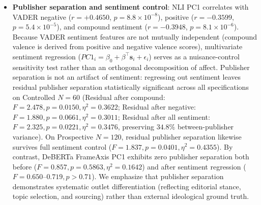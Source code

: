 \begin{itemize}
    \item \textbf{Publisher separation and sentiment control}: NLI PC1 correlates with VADER negative ($r = +0.4650$, $p = 8.8 \times 10^{-8}$), positive ($r = -0.3599$, $p = 5.4 \times 10^{-5}$), and compound sentiment ($r = -0.3948$, $p = 8.1 \times 10^{-6}$). Because VADER sentiment features are not mutually independent (compound valence is derived from positive and negative valence scores), multivariate sentiment regression ($PC1_i = \beta_0 + \beta^\top \mathbf{s}_i + \epsilon_i$) serves as a nuisance-control sensitivity test rather than an orthogonal decomposition of affect. Publisher separation is not an artifact of sentiment: regressing out sentiment leaves residual publisher separation statistically significant across all specifications on Controlled $N=60$ (Residual after compound: $F = \mathbf{2.478}, p = \mathbf{0.0150}, \eta^2 = \mathbf{0.3622}$; Residual after negative: $F = 1.880, p = 0.0661, \eta^2 = 0.3011$; Residual after all sentiment: $F = \mathbf{2.325}, p = \mathbf{0.0221}, \eta^2 = \mathbf{0.3476}$, preserving $34.8\%$ between-publisher variance). On Prospective $N=120$, residual publisher separation likewise survives full sentiment control ($F = \mathbf{1.837}, p = \mathbf{0.0401}, \eta^2 = \mathbf{0.4355}$). By contrast, DeBERTa FrameAxis PC1 exhibits zero publisher separation both before ($F = 0.857, p = 0.5863, \eta^2 = 0.1642$) and after sentiment regression ($F = 0.650$--$0.719, p > 0.71$). We emphasize that publisher separation demonstrates systematic outlet differentiation (reflecting editorial stance, topic selection, and sourcing) rather than external ideological ground truth.
\end{itemize}

